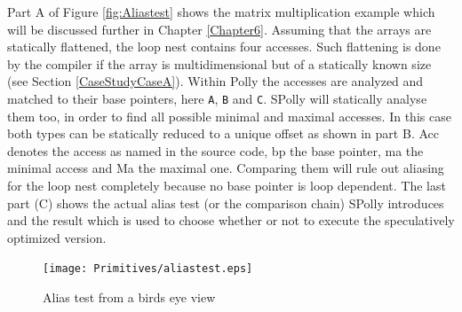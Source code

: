 Part {\footnotesize{A}} of Figure \ref{fig:Aliastest} 
shows the matrix multiplication example which will be discussed
further in Chapter \ref{Chapter6}. Assuming that the arrays are statically 
flattened, the loop nest contains four accesses. Such flattening is done by the 
compiler if the array is multidimensional but of a statically known size
(see Section \ref{CaseStudyCaseA}). Within Polly 
the accesses are analyzed and matched to their base pointers, here \texttt{A},
\texttt{B} and \texttt{C}.  SPolly will statically analyse them too, in order to
find all possible minimal and maximal accesses. In this case both types can be
statically reduced to a unique offset as shown in part {\footnotesize{B}}. 
Acc denotes the access as named in the source code,
bp the base pointer, ma the minimal access and Ma the 
maximal one. Comparing them will rule out aliasing for the loop nest
completely because no base pointer is loop dependent. The last part
({\footnotesize{C}}) shows the actual alias test (or the comparison chain)
SPolly introduces and the result which is used
to choose whether or not to execute the speculatively optimized version.



\lstset{frame=none}
\begin{figure}[htbp]
  \centering
    \texttt{[image: Primitives/aliastest.eps]}
  \caption{Alias test from a birds eye view}
  \label{fig:AliastestConcept}  
\end{figure}


